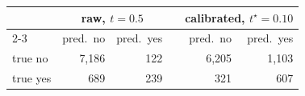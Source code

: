\begin{tabular}{lrrcrr}
\toprule
 & \multicolumn{2}{c}{raw, $t=0.5$} & & \multicolumn{2}{c}{calibrated, $t^\star=0.10$} \\
\cmidrule{2-3}\cmidrule{5-6}
 & pred.\ no & pred.\ yes & & pred.\ no & pred.\ yes \\
\midrule
true no & 7,186 & 122 & & 6,205 & 1,103 \\
true yes & 689 & 239 & & 321 & 607 \\
\bottomrule
\end{tabular}